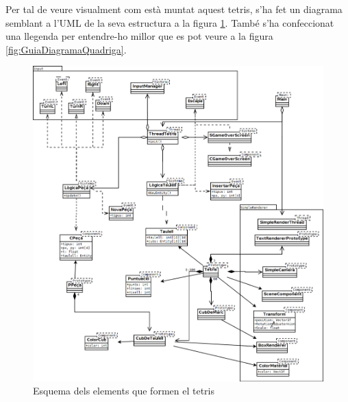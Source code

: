     Per tal de veure visualment com està muntat aquest tetris, s'ha fet un diagrama semblant a l'UML de la seva estructura a la figura \ref{fig:TetrisEntitats}. També s'ha confeccionat una llegenda per entendre-ho millor que es pot veure a la figura \ref{fig:GuiaDiagramaQuadriga}.

    \begin{figure}
      \includegraphics[width=1\linewidth]{./img/TetrisEntitats.png}
      \caption{Esquema dels elements que formen el tetris \label{fig:TetrisEntitats}}
    \end{figure}

